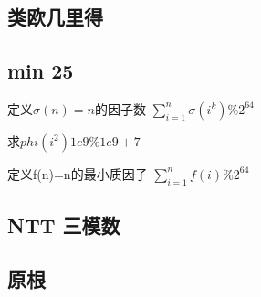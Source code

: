 	\subsection{类欧几里得}
		
	\subsection{min 25}
		\begin{flushleft}
			定义$\sigma(n)=n$的因子数
			\linebreak $\sum_{i=1}^n\sigma(i^k)  \%  2^{64}  $
		\end{flushleft}
		
		\begin{flushleft}
			$求phi( i^2 ) 1e9 \% 1e9+7 $
		\end{flushleft}
		
		\begin{flushleft}
			定义f(n)=n的最小质因子
			\linebreak $\sum_{i=1}^{n}f(i)   \% 2^{64}$
		\end{flushleft}
		
	\subsection{NTT 三模数}
		
	\subsection{原根}
		